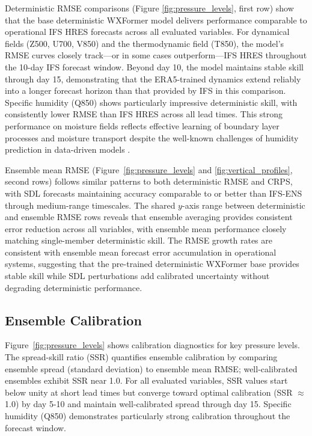 \documentclass[11pt]{article}
\begin{document}
Deterministic RMSE comparisons (Figure \ref{fig:pressure_levels}, first row) show that the base deterministic WXFormer model delivers performance comparable to operational IFS HRES forecasts across all evaluated variables. For dynamical fields (Z500, U700, V850) and the thermodynamic field (T850), the model’s RMSE curves closely track—or in some cases outperform—IFS HRES throughout the 10-day IFS forecast window. Beyond day 10, the model maintains stable skill through day 15, demonstrating that the ERA5-trained dynamics extend reliably into a longer forecast horizon than that provided by IFS in this comparison. Specific humidity (Q850) shows particularly impressive deterministic skill, with consistently lower RMSE than IFS HRES across all lead times. This strong performance on moisture fields reflects effective learning of boundary layer processes and moisture transport despite the well-known challenges of humidity prediction in data-driven models \cite{bi2023pangu, Lam2023graphcast}.

Ensemble mean RMSE (Figure~\ref{fig:pressure_levels} and \ref{fig:vertical_profiles}, second rows) follows similar patterns to both deterministic RMSE and CRPS, with SDL forecasts maintaining accuracy comparable to or better than IFS-ENS through medium-range timescales. The shared $y$-axis range between deterministic and ensemble RMSE rows reveals that ensemble averaging provides consistent error reduction across all variables, with ensemble mean performance closely matching single-member deterministic skill. The RMSE growth rates are consistent with ensemble mean forecast error accumulation in operational systems, suggesting that the pre-trained deterministic WXFormer base provides stable skill while SDL perturbations add calibrated uncertainty without degrading deterministic performance.

\subsection{Ensemble Calibration}

Figure~\ref{fig:pressure_levels} shows calibration diagnostics for key pressure levels. The spread-skill ratio (SSR) quantifies ensemble calibration by comparing ensemble spread (standard deviation) to ensemble mean RMSE; well-calibrated ensembles exhibit SSR near 1.0. For all evaluated variables, SSR values start below unity at short lead times but converge toward optimal calibration (SSR $\approx$ 1.0) by day 5-10 and maintain well-calibrated spread through day 15. Specific humidity (Q850) demonstrates particularly strong calibration throughout the forecast window.
\end{document}
